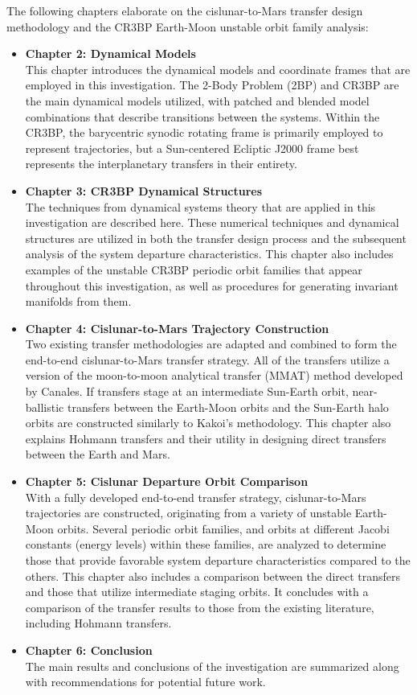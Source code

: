 The following chapters elaborate on the cislunar-to-Mars transfer design methodology and the CR3BP
Earth-Moon unstable orbit family analysis:
\begin{itemize}
	\item	\textbf{Chapter 2: Dynamical Models}\\
			This chapter introduces the dynamical models and coordinate frames that are employed in
			this investigation. The 2-Body Problem (2BP) and CR3BP are the main dynamical models
			utilized, with patched and blended model combinations that describe transitions between
			the systems. Within the CR3BP, the barycentric synodic rotating frame is primarily
			employed to represent trajectories, but a Sun-centered Ecliptic J2000 frame best
			represents the interplanetary transfers in their entirety.
	\item	\textbf{Chapter 3: CR3BP Dynamical Structures}\\
			The techniques from dynamical systems theory that are applied in this investigation are
			described here. These numerical techniques and dynamical structures are utilized in
			both the transfer design process and the subsequent analysis of the system departure
			characteristics. This chapter also includes examples of the unstable CR3BP periodic
			orbit families that appear throughout this investigation, as well as procedures for
			generating invariant manifolds from them.
	\item	\textbf{Chapter 4: Cislunar-to-Mars Trajectory Construction}\\
			Two existing transfer methodologies are adapted and combined to form the end-to-end
			cislunar-to-Mars transfer strategy. All of the transfers utilize a version of the
			moon-to-moon analytical transfer (MMAT) method developed by
			Canales\cite{Canales:2021b}. If transfers stage at an intermediate Sun-Earth orbit,
			near-ballistic transfers between the Earth-Moon orbits and the Sun-Earth halo orbits
			are constructed similarly to Kakoi's methodology\cite{Kakoi:2015}. This chapter also
			explains Hohmann transfers and their utility in designing direct transfers between the
			Earth and Mars.
	\item	\textbf{Chapter 5: Cislunar Departure Orbit Comparison}\\
			With a fully developed end-to-end transfer strategy, cislunar-to-Mars trajectories are
			constructed, originating from a variety of unstable Earth-Moon orbits. Several periodic
			orbit families, and orbits at different Jacobi constants (energy levels) within these
			families, are analyzed to determine those that provide favorable system departure
			characteristics compared to the others. This chapter also includes a comparison between
			the direct transfers and those that utilize intermediate staging orbits. It concludes
			with a comparison of the transfer results to those from the existing literature,
			including Hohmann transfers.
	\item	\textbf{Chapter 6: Conclusion}\\
			The main results and conclusions of the investigation are summarized along with
			recommendations for potential future work.
\end{itemize}
